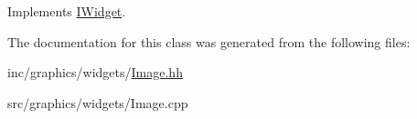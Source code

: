 Implements \hyperlink{classIWidget_a0cfa49a402e9bb31808a715e048ab2f4}{I\+Widget}.



The documentation for this class was generated from the following files\+:\begin{DoxyCompactItemize}
\item 
inc/graphics/widgets/\hyperlink{Image_8hh}{Image.\+hh}\item 
src/graphics/widgets/Image.\+cpp\end{DoxyCompactItemize}
